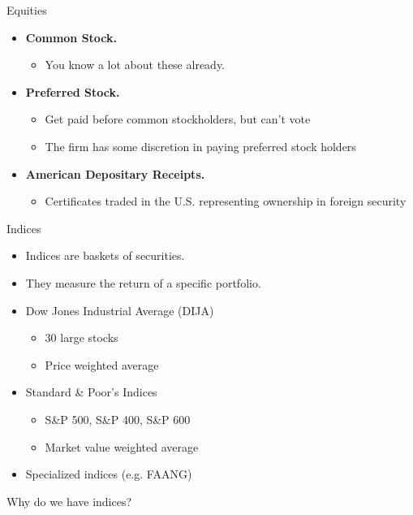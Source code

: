 \documentclass{beamer}
\begin{document}
\begin{frame}{Equities}
\begin{itemize}
\item[1.]\textbf{Common Stock.}
\begin{itemize}
\item You know a lot about these already.
\end{itemize} 
\item[2.]\textbf{Preferred Stock.}
\begin{itemize}
\item Get paid before common stockholders, but can't vote
\item The firm has some discretion in paying preferred stock holders
\end{itemize} 
\item[3.]\textbf{American Depositary Receipts.}
\begin{itemize}
\item Certificates traded in the U.S. representing ownership in foreign security
\end{itemize}
\end{itemize}
\end{frame}

\begin{frame}{Indices}
\begin{itemize}
\item Indices are baskets of securities.
\item They measure the return of a specific portfolio.
\item Dow Jones Industrial Average (DIJA)
\begin{itemize}
\item 30 large stocks
\item Price weighted average
\end{itemize}
\item Standard \& Poor’s Indices 
\begin{itemize}
\item S\&P 500, S\&P 400, S\&P 600
\item Market value weighted average
\end{itemize}
\item Specialized indices (e.g. FAANG)
\end{itemize}
\begin{center}
Why do we have indices? 
\end{center}
\end{frame}
\end{document}
